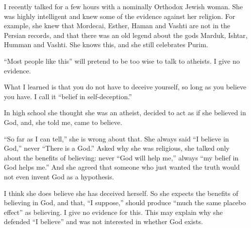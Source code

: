 
I recently talked for a few hours with a nominally Orthodox Jewish woman. She was highly intelligent and knew some of the evidence against her religion. For example, she knew that Mordecai, Esther, Haman and Vashti are not in the Persian records, and that there was an old legend about the gods Marduk, Ishtar, Humman and Vashti. She knows this, and she still celebrates Purim. 

``Most people like this'' will pretend to be too wise to talk to atheists. I give no evidence.

What I learned is that you do not have to deceive yourself, so long as you believe you have. I call it ``belief in self-deception.''

In high school she thought she was an atheist, decided to act as if she believed in God, and, she told me, came to believe. 

``So far as I can tell,'' she is wrong about that. She always said ``I believe in God,'' never ``There is a God.'' Asked why she was religious, she talked only about the benefits of believing: never ``God will help me,'' always ``my belief in God helps me.'' And she agreed that someone who just wanted the truth would not even invent God as a hypothesis. 

I think she does believe she has deceived herself. So she expects the benefits of believing in God, and that, ``I suppose,'' should produce ``much the same placebo effect'' as believing. I give no evidence for this.  This may explain why she defended ``I believe'' and was not interested in whether God exists.

